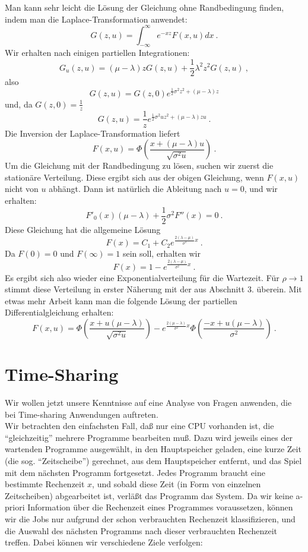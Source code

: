 \begin{enumerate}
Man kann sehr leicht die Lösung der Gleichung ohne Randbedingung finden, indem man die Laplace-Transformation anwendet:
\[G(z,u)=\int_{-\infty}^{\infty} e^{-xz}F(x,u)dx ~.\]
Wir erhalten nach einigen partiellen Integrationen:
\[G_{u}(z,u) = (\mu-\lambda)zG(z,u)+\frac{1}{2}\lambda^{2}z^{2}G(z,u) ~, \]
also
\[ G(z,u) = G(z,0)e^{\frac{1}{2}\sigma^{2}z^{2}+(\mu - \lambda)z}  \]
und, da $G(z,0)=\frac{1}{z}$
\[G(z,u) = \frac{1}{z}e^{\frac{1}{2}\sigma^{2}uz^{2}+(\mu - \lambda)zu} ~.\]
Die Inversion der Laplace-Transformation liefert
\[F(x,u)=\Phi\left(\frac{x+(\mu - \lambda)u}{\sqrt{\sigma^{2}u}}\right) ~.  \]
Um die Gleichung mit der Randbedingung zu lösen, suchen wir zuerst die stationäre Verteilung. Diese ergibt sich aus der obigen Gleichung, wenn $F(x,u)$ nicht
von $u$ abhängt. Dann ist natürlich die Ableitung nach $u = 0$, und wir erhalten:
\[ F'_{0}(x)(\mu - \lambda)+\frac{1}{2}\sigma^{2}F''(x)=0 ~. \]
Diese Gleichung hat die allgemeine Lösung
\[F(x) = C_{1}+C_{2}e^{\frac{2(\lambda - \mu)}{\sigma^{2}}x} ~. \]
Da $F(0) = 0$ und $F(\infty) = 1$ sein soll, erhalten wir
\[F(x) = 1-e^{\frac{2(\lambda - \mu)}{\sigma^{2}}x} ~.  \]
Es ergibt sich also wieder eine Exponentialverteilung für die Wartezeit. Für $\rho \rightarrow 1$ stimmt diese Verteilung in erster Näherung mit der aus
Abschnitt $3.$ überein. Mit etwas mehr Arbeit kann man die folgende Lösung der partiellen Differentialgleichung erhalten:
\[F(x,u)=\Phi\left(\frac{x+u(\mu - \lambda)}{\sqrt{\sigma^{2}u}}\right)-e^{\frac{2(\mu - \lambda)}{\sigma^{2}}x}\Phi\left(\frac{-x+u(\mu -
\lambda)}{\sigma^{2}}\right) ~.\]
\end {enumerate}
\chapter{Time-Sharing}
Wir wollen jetzt unsere Kenntnisse auf eine Analyse von Fragen anwenden, die bei Time-sharing Anwendungen auftreten. \\
Wir betrachten den einfachsten Fall, daß nur eine CPU vorhanden ist, die \enquote{gleichzeitig} mehrere Programme bearbeiten muß.
Dazu wird jeweils eines der wartenden Programme ausgewählt, in den Hauptspeicher geladen, eine kurze Zeit (die sog. \enquote{Zeitscheibe}) gerechnet,
aus dem
Hauptspeicher entfernt, und das Spiel mit dem nächsten Programm fortgesetzt. Jedes Programm braucht eine bestimmte Rechenzeit $x$, und sobald
diese Zeit (in
Form von einzelnen Zeitscheiben) abgearbeitet ist, verläßt das Programm das System. Da wir keine a-priori Information über die Rechenzeit eines Programmes
voraussetzen, können wir die Jobs nur aufgrund der schon verbrauchten Rechenzeit klassifizieren, und die Auswahl des nächsten Programms nach dieser verbrauchten
Rechenzeit treffen. Dabei können wir verschiedene Ziele verfolgen:


